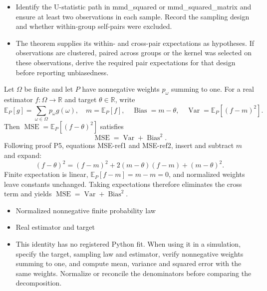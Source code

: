 \expandafter\def\csname statadic@diagnostics@STATADIC-MMD-001\endcsname{\begin{itemize}
\item Identify the U-statistic path in mmd\_squared or mmd\_squared\_matrix and ensure at least two observations in each sample. Record the sampling design and whether within-group self-pairs were excluded.
\item The theorem supplies its within- and cross-pair expectations as hypotheses. If observations are clustered, paired across groups or the kernel was selected on these observations, derive the required pair expectations for that design before reporting unbiasedness.
\end{itemize}}
\expandafter\def\csname statadic@statement@STATADIC-MOMENTS-001\endcsname{Let $\Omega$ be finite and let $P$ have nonnegative weights
  $p_\omega$ summing to one. For a real estimator $f:\Omega\to\mathbb R$ and
  target $\theta\in\mathbb R$, write
  \[
  \mathbb E_P[g]=\sum_{\omega\in\Omega}p_\omega g(\omega),\quad
  m=\mathbb E_P[f],\quad \operatorname{Bias}=m-\theta,\quad
  \operatorname{Var}=\mathbb E_P[(f-m)^2].
  \]
  Then $\operatorname{MSE}=\mathbb E_P[(f-\theta)^2]$ satisfies
  \[
  \operatorname{MSE}=\operatorname{Var}+\operatorname{Bias}^2.
  \]}
\expandafter\def\csname statadic@proof@STATADIC-MOMENTS-001\endcsname{Following proof P5, equations MSE-ref1 and MSE-ref2, insert and
  subtract $m$ and expand:
  \[
  (f-\theta)^2=(f-m)^2+2(m-\theta)(f-m)+(m-\theta)^2.
  \]
  Finite expectation is linear, $\mathbb E_P[f-m]=m-m=0$, and normalized
  weights leave constants unchanged. Taking expectations therefore eliminates
  the cross term and yields $\operatorname{MSE}=\operatorname{Var}+
  \operatorname{Bias}^2$.}
\expandafter\def\csname statadic@assumptions@STATADIC-MOMENTS-001\endcsname{\begin{itemize}
\item Normalized nonnegative finite probability law
\item Real estimator and target
\end{itemize}}
\expandafter\def\csname statadic@diagnostics@STATADIC-MOMENTS-001\endcsname{\begin{itemize}
\item This identity has no registered Python fit. When using it in a simulation, specify the target, sampling law and estimator, verify nonnegative weights summing to one, and compute mean, variance and squared error with the same weights. Normalize or reconcile the denominators before comparing the decomposition.
\end{itemize}}
